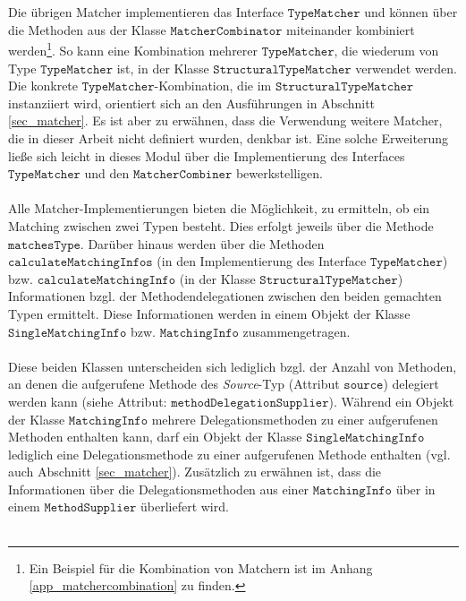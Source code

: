 {{\\\\
Die übrigen Matcher implementieren das Interface $\texttt{TypeMatcher}$ und können über die Methoden aus der Klasse $\texttt{MatcherCombinator}$ miteinander kombiniert werden\footnote{Ein Beispiel für die Kombination von Matchern ist im Anhang \ref{app_matchercombination} zu finden.}. 
So kann eine Kombination mehrerer $\texttt{TypeMatcher}$, die wiederum von Type $\texttt{TypeMatcher}$ ist, in der Klasse $\texttt{StructuralTypeMatcher}$ verwendet werden. Die konkrete $\texttt{TypeMatcher}$-Kombination, die im $\texttt{StructuralTypeMatcher}$ instanziiert wird, orientiert sich an den Ausführungen in Abschnitt \ref{sec_matcher}. Es ist aber zu erwähnen, dass die Verwendung weitere Matcher, die in dieser Arbeit nicht definiert wurden, denkbar ist. Eine solche Erweiterung ließe sich leicht in dieses Modul über die Implementierung des Interfaces $\texttt{TypeMatcher}$ und den $\texttt{MatcherCombiner}$ bewerkstelligen.
\\\\
Alle Matcher-Implementierungen bieten die Möglichkeit, zu ermitteln, ob ein Matching zwischen zwei Typen besteht. Dies erfolgt jeweils über die Methode $\texttt{matchesType}$. Darüber hinaus werden über die Methoden $\texttt{calculateMatchingInfos}$ (in den Implementierung des Interface $\texttt{TypeMatcher}$) bzw. $\texttt{calculateMatchingInfo}$ (in der Klasse $\texttt{StructuralTypeMatcher}$) Informationen bzgl. der Methodendelegationen zwischen den beiden gemachten Typen ermittelt. Diese Informationen werden in einem Objekt der Klasse $\texttt{SingleMatchingInfo}$ bzw. $\texttt{MatchingInfo}$ zusammengetragen. 
\\\\
Diese beiden Klassen unterscheiden sich lediglich bzgl. der Anzahl von Methoden, an denen die aufgerufene Methode des \emph{Source}-Typ (Attribut $\texttt{source}$) delegiert werden kann (siehe Attribut: $\texttt{methodDelegationSupplier}$). Während ein Objekt der Klasse $\texttt{MatchingInfo}$ mehrere Delegationsmethoden zu einer aufgerufenen Methoden enthalten kann, darf ein Objekt der Klasse $\texttt{SingleMatchingInfo}$ lediglich eine Delegationsmethode zu einer aufgerufenen Methode enthalten (vgl. auch Abschnitt \ref{sec_matcher}). Zusätzlich zu erwähnen ist, dass die Informationen über die Delegationsmethoden aus einer $\texttt{MatchingInfo}$ über in einem $\texttt{MethodSupplier}$ überliefert wird.
\\\\
}}
